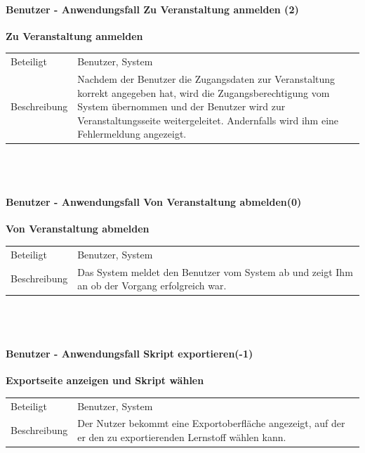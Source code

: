 \documentclass[12pt,a4paper]{article}
\begin{document}
\newpage

\paragraph{Benutzer - Anwendungsfall \glqq Zu Veranstaltung anmelden \grqq (2)}\mbox{}

\textbf{Zu Veranstaltung anmelden}\\
\begin{tabular}{l|p{12cm}}
\hline 
Beteiligt & Benutzer, System \\ 
Beschreibung & Nachdem der Benutzer die Zugangsdaten zur Veranstaltung korrekt angegeben hat, wird die Zugangsberechtigung vom System übernommen und der Benutzer wird zur Veranstaltungsseite weitergeleitet. Andernfalls wird ihm eine Fehlermeldung angezeigt.\\ 
\end{tabular}\\\\


\paragraph{Benutzer - Anwendungsfall \glqq Von Veranstaltung abmelden\grqq (0)}\mbox{}

\textbf{Von Veranstaltung abmelden}\\
\begin{tabular}{l|p{12cm}}
\hline 
Beteiligt & Benutzer, System \\ 
Beschreibung & Das System meldet den Benutzer vom System ab und zeigt Ihm an ob der Vorgang erfolgreich war. \\ 
\end{tabular}\\\\


\paragraph{Benutzer - Anwendungsfall \glqq Skript exportieren\grqq (-1)}\mbox{}

\textbf{Exportseite anzeigen und Skript wählen}\\
\begin{tabular}{l|p{12cm}}
\hline 
Beteiligt & Benutzer, System \\ 
Beschreibung & Der Nutzer bekommt eine Exportoberfläche angezeigt, auf der er den zu exportierenden Lernstoff wählen kann. \\ 
\end{tabular}\\
\end{document}
